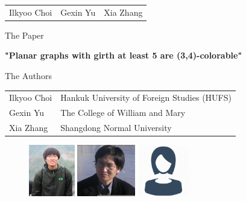 \documentclass[10pt, compress]{beamer}
\begin{document}
\begin{frame}[plain,t]
\begin{table}[]
\centering
\begin{tabular}{C{3cm} C{3cm} C{3cm}}
Ilkyoo Choi & Gexin Yu & Xia Zhang
\end{tabular}
\end{table}
\end{frame}

\begin{frame}{The Paper}
\vspace{1cm}
\begin{center}
\centering
{\LARGE\textbf{"Planar graphs with girth at least 5 are (3,4)-colorable"}}
\end{center}
\end{frame}

\begin{frame}{The Authors}
\begin{center}
\begin{table}[]
\centering
\begin{tabular}{l l}
Ilkyoo Choi & Hankuk University of Foreign Studies (HUFS)\\
Gexin Yu & The College of William and Mary\\
Xia Zhang & Shangdong Normal University
\end{tabular}
\end{table}
\begin{figure}[!tbp]
\centering
\begin{minipage}[b]{0.2\textwidth}
\includegraphics[width=\textwidth,height=2.25cm]{figures/choi.png}
\end{minipage}
\hfill
\begin{minipage}[b]{0.2\textwidth}
\includegraphics[width=\textwidth,height=2.25cm]{figures/yu.jpg}
\end{minipage}
\hfill
\begin{minipage}[b]{0.2\textwidth}
\includegraphics[width=\textwidth,height=2.25cm]{figures/zhang.png}
\end{minipage}
\end{figure}
\end{center}
\end{frame}
\end{document}
